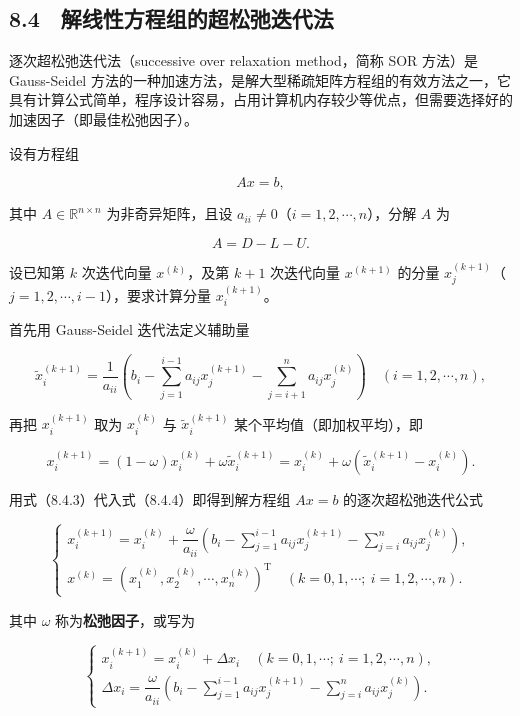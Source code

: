\documentclass[
  10pt,
  fontset=fandol]{ctexart}
\begin{document}
\subsection{8.4　解线性方程组的超松弛迭代法}\label{ux89e3ux7ebfux6027ux65b9ux7a0bux7ec4ux7684ux8d85ux677eux5f1bux8fedux4ee3ux6cd5}

逐次超松弛迭代法（successive over relaxation method，简称 SOR 方法）是 Gauss-Seidel 方法的一种加速方法，是解大型稀疏矩阵方程组的有效方法之一，它具有计算公式简单，程序设计容易，占用计算机内存较少等优点，但需要选择好的加速因子（即最佳松弛因子）。

设有方程组

\[
Ax=b,
\tag{8.4.1}
\]

其中 \(A\in\mathbb R^{n\times n}\) 为非奇异矩阵，且设 \(a_{ii}\neq0\)（\(i=1,2,\cdots,n\)），分解 \(A\) 为

\[
A=D-L-U.
\tag{8.4.2}
\]

设已知第 \(k\) 次迭代向量 \(x^{(k)}\)，及第 \(k+1\) 次迭代向量 \(x^{(k+1)}\) 的分量 \(x_j^{(k+1)}\)（\(j=1,2,\cdots,i-1\)），要求计算分量 \(x_i^{(k+1)}\)。

首先用 Gauss-Seidel 迭代法定义辅助量

\[
\tilde{x}_i^{(k+1)}=\frac1{a_{ii}}\left(b_i-\sum_{j=1}^{i-1}a_{ij}x_j^{(k+1)}-\sum_{j=i+1}^{n}a_{ij}x_j^{(k)}\right)\quad(i=1,2,\cdots,n),
\tag{8.4.3}
\]

再把 \(x_i^{(k+1)}\) 取为 \(x_i^{(k)}\) 与 \(\tilde{x}_i^{(k+1)}\) 某个平均值（即加权平均），即

\[
x_i^{(k+1)}=(1-\omega)x_i^{(k)}+\omega\tilde{x}_i^{(k+1)}
=x_i^{(k)}+\omega(\tilde{x}_i^{(k+1)}-x_i^{(k)}).
\tag{8.4.4}
\]

用式（8.4.3）代入式（8.4.4）即得到解方程组 \(Ax=b\) 的逐次超松弛迭代公式

\[
\begin{cases}
x_i^{(k+1)}=x_i^{(k)}+\dfrac{\omega}{a_{ii}}\left(b_i-\displaystyle\sum_{j=1}^{i-1}a_{ij}x_j^{(k+1)}-\displaystyle\sum_{j=i}^n a_{ij}x_j^{(k)}\right),\\[5pt]
x^{(k)}=(x_1^{(k)},x_2^{(k)},\cdots,x_n^{(k)})^{\mathrm T}\quad(k=0,1,\cdots;\ i=1,2,\cdots,n).
\end{cases}
\tag{8.4.5}
\]

其中 \(\omega\) 称为\textbf{松弛因子}，或写为

\[
\begin{cases}
x_i^{(k+1)}=x_i^{(k)}+\Delta x_i\quad(k=0,1,\cdots;\ i=1,2,\cdots,n),\\[5pt]
\Delta x_i=\dfrac{\omega}{a_{ii}}\left(b_i-\displaystyle\sum_{j=1}^{i-1}a_{ij}x_j^{(k+1)}-\displaystyle\sum_{j=i}^n a_{ij}x_j^{(k)}\right).
\end{cases}
\tag{8.4.6}
\]
\end{document}
